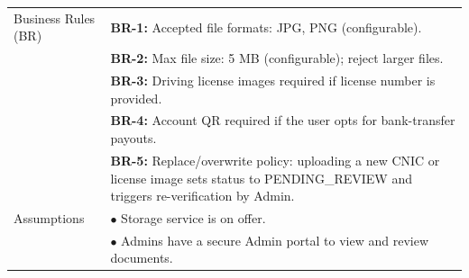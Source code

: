 \begin{longtable}{|>{\raggedright\arraybackslash}p{4cm}|>{\raggedright\arraybackslash}p{11cm}|}
Business Rules (BR) & \textbf{BR-1:} Accepted file formats: JPG, PNG (configurable). \\
& \textbf{BR-2:} Max file size: 5 MB (configurable); reject larger files. \\
& \textbf{BR-3:} Driving license images required if license number is provided. \\
& \textbf{BR-4:} Account QR required if the user opts for bank-transfer payouts. \\
& \textbf{BR-5:} Replace/overwrite policy: uploading a new CNIC or license image sets status to PENDING\_REVIEW and triggers re-verification by Admin. \\
\hline
Assumptions & $\bullet$ Storage service is on offer. \\
& $\bullet$ Admins have a secure Admin portal to view and review documents. \\
\end{longtable}

